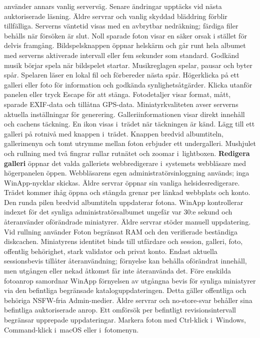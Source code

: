 \documentclass[11pt,a4paper]{article}
\newcommand{\ui}[1]{\textbf{#1}}
\begin{document}
använder annars vanlig serverväg. Senare ändringar upptäcks vid nästa
auktoriserade läsning. Äldre servrar
och vanlig skyddad bläddring förblir tillfälliga. Serverns väntetid visas med
en avbrytbar nedräkning; färdiga filer behålls när försöken är slut.
Noll sparade foton visar en säker orsak i stället för delvis framgång.
Bildspelsknappen öppnar helskärm och går runt hela albumet med serverns
aktiverade intervall eller fem sekunder som standard. Godkänd musik börjar
spela när bildspelet startar. Musikreglagen spelar, pausar och byter spår.
Spelaren läser en lokal fil och förbereder nästa spår.
Högerklicka på ett galleri eller foto för information och godkända
synlighetsåtgärder. Klicka utanför panelen eller tryck Escape för att stänga.
Fotodetaljer visar format, mått, sparade EXIF-data och tillåtna GPS-data.
Miniatyrkvaliteten avser serverns aktuella inställningar för generering.
Galleriinformationen visar direkt innehåll och cachens täckning. En ikon
visas i~trädet när täckningen är känd. Lägg till ett galleri på rotnivå
med knappen i~trädet. Knappen bredvid albumtiteln, gallerimenyn och tomt
utrymme mellan foton erbjuder ett undergalleri. Mushjulet och rullning med
två fingrar rullar rutnätet och zoomar i~lightboxen.
\ui{Redigera galleri} öppnar det valda galleriets webbredigerare i~systemets
webbläsare med högerpanelen öppen. Webbläsarens egen administratörsinloggning
används; inga WinApp-nycklar skickas. Äldre servrar öppnar sin vanliga
helsidesredigerare.
Trädet kommer ihåg öppna och stängda grenar per länkad webbplats och konto.
Den runda pilen bredvid albumtiteln uppdaterar fotona. WinApp kontrollerar
indexet för det synliga administratörsalbumet ungefär var 30:e sekund och
återanvänder oförändrade miniatyrer. Äldre servrar stöder manuell uppdatering.
Vid rullning använder Foton begränsat RAM och den verifierade beständiga
diskcachen. Miniatyrens identitet binds till utfärdare och session, galleri,
foto, offentlig behörighet, stark validator och privat konto. Endast aktuella
sessionsbevis tillåter återanvändning; förnyelse kan behålla oförändrat innehåll,
men utgången eller nekad åtkomst får inte återanvända det. Före enskilda
fotoanrop samordnar WinApp förnyelsen av utgångna bevis för synliga miniatyrer
via den befintliga begränsade kataloguppdateringen. Detta gäller offentliga och
behöriga NSFW-fria Admin-medier. Äldre servrar och no-store-svar behåller sina
befintliga auktoriserade anrop. Ett omförsök per befintligt revisionsintervall
begränsar upprepade uppdateringar.
Markera foton med Ctrl-klick i~Windows, Command-klick i~macOS eller i~fotomenyn.
\end{document}
